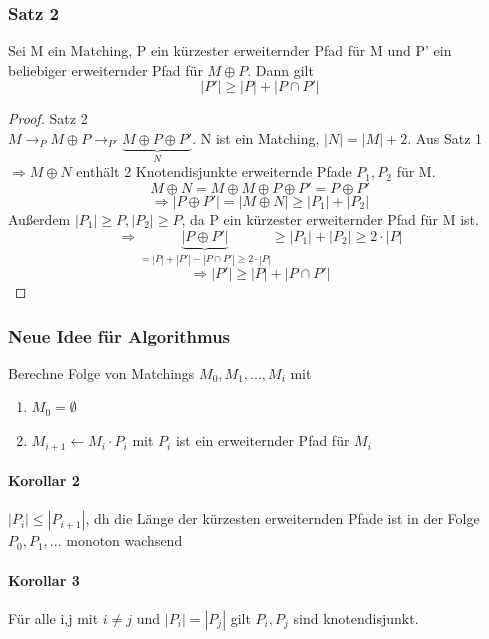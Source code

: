 \subsubsection{Satz 2}
Sei M ein Matching, P ein kürzester erweiternder Pfad für M und P' ein beliebiger erweiternder Pfad für $ M \oplus P $. Dann gilt 
$$ |P'| \geq |P| + |P \cap P'| $$


\begin{proof} Satz 2 \\
$ M \rightarrow_P M \oplus P \rightarrow_{P'} \underbrace{M \oplus P \oplus P'}_N $. N ist ein Matching, $|N| = |M| + 2$. Aus Satz 1 $ \Rightarrow M \oplus N $ enthält 2 Knotendisjunkte erweiternde Pfade $ P_1,P_2 $ für M. 
$$ M \oplus N = M \oplus M \oplus P \oplus P' = P \oplus P ' $$
$$ \Rightarrow |P \oplus P'| = |M \oplus N | \geq |P_1| + |P_2| $$
Außerdem $ |P_1| \geq P, |P_2| \geq P $, da P ein kürzester erweiternder Pfad für M ist.
$$ \Rightarrow \underbrace{|P \oplus P'|}_{= |P| + |P'| - |P \cap P'| \geq 2 \cdot |P| } \geq |P_1| + |P_2| \geq 2 \cdot |P| $$
$$ \Rightarrow |P'| \geq |P| + |P \cap P'| $$

\end{proof}
 
\subsubsection{Neue Idee für Algorithmus} Berechne Folge von Matchings $ M_0, M_1,..., M_i $ mit 
\begin{enumerate}
    \item $ M_0 = \emptyset $
    \item $ M_{i+1} \gets M_i \cdot P_i $ mit $P_i$ ist ein erweiternder Pfad für $ M_i $
\end{enumerate}

\paragraph{Korollar 2} $ |P_i| \leq |P_{i + 1}| $, dh die Länge der kürzesten erweiternden Pfade ist in der Folge $ P_0,P_1,... $ monoton wachsend

\paragraph{Korollar 3} Für alle i,j mit $ i \neq j $ und $ |P_i| = |P_j| $ gilt $ P_i, P_j $ sind knotendisjunkt.


